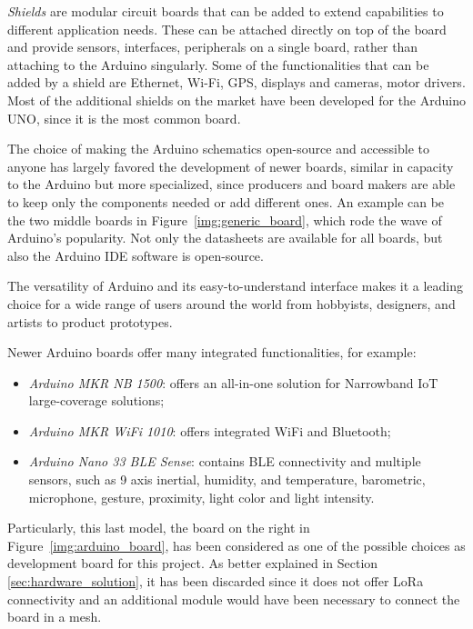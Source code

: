 			\textit{Shields} are modular circuit boards that can be added to extend capabilities to different application needs.
			These can be attached directly on top of the board and provide sensors, interfaces, peripherals on a single board, rather than attaching to the Arduino singularly.
			Some of the functionalities that can be added by a shield are Ethernet, Wi-Fi, GPS, displays and cameras, motor drivers.
			Most of the additional shields on the market have been developed for the Arduino UNO, since it is the most common board.
			
			The choice of making the Arduino schematics open-source and accessible to anyone has largely favored the development of newer boards, similar in capacity to the Arduino but more specialized, since producers and board makers are able to keep only the components needed or add different ones.
			An example can be the two middle boards in Figure~\ref{img:generic_board}, which rode the wave of Arduino's popularity.
			Not only the datasheets are available for all boards, but also the Arduino IDE software is open-source.
			
			The versatility of Arduino and its easy-to-understand interface makes it a leading choice for a wide range of users around the world from hobbyists, designers, and artists to product prototypes. 
			
			Newer Arduino boards offer many integrated functionalities, for example:
			\begin{itemize}
				\item \textit{Arduino MKR NB 1500}: offers an all-in-one solution for Narrowband IoT large-coverage solutions;
				\item \textit{Arduino MKR WiFi 1010}: offers integrated WiFi and Bluetooth;
				\item \textit{Arduino Nano 33 BLE Sense}: contains BLE connectivity and multiple sensors, such as 9 axis inertial, humidity, and temperature, barometric, microphone, gesture, proximity, light color and light intensity.
			\end{itemize}
		
			Particularly, this last model, the board on the right in Figure~\ref{img:arduino_board}, has been considered as one of the possible choices as development board for this project.
			As better explained in Section \ref{sec:hardware_solution}, it has been discarded since it does not offer LoRa connectivity and an additional module would have been necessary to connect the board in a mesh.
								
